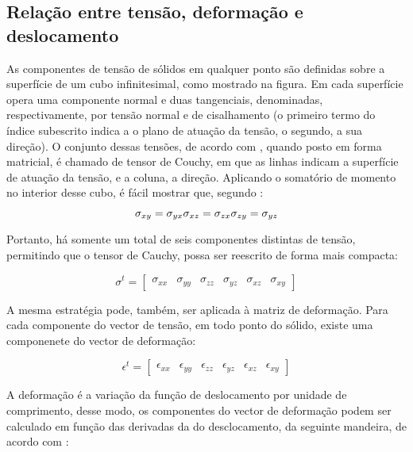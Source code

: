 \subsection{Relação entre tensão, deformação e deslocamento}

As componentes de tensão de sólidos em qualquer ponto são definidas sobre a superfície de um cubo infinitesimal, como mostrado na figura. Em cada superfície opera uma componente normal e duas tangenciais, denominadas, respectivamente, por tensão normal e de cisalhamento (o primeiro termo do índice subescrito indica a o plano de atuação da tensão, o segundo, a sua direção). O conjunto dessas tensões, de acordo com , quando posto em forma matricial, é chamado de tensor de Couchy, em que as linhas indicam a superfície de atuação da tensão, e a coluna, a direção. Aplicando o somatório de momento no interior desse cubo, é fácil mostrar que, segundo :

\begin{equation}
    \sigma_{xy} = \sigma_{yx} \\
    \sigma_{xz} = \sigma_{zx} \\
    \sigma_{zy} = \sigma_{yz} \\
\end{equation}

Portanto, há somente um total de seis componentes distintas de tensão, permitindo que o tensor de Cauchy, possa ser reescrito de forma mais compacta:

\begin{equation} \label{eq:vetor_tensao}
    \sigma^t =  \begin{bmatrix}
        \sigma_{xx} & \sigma_{yy} & \sigma_{zz} & \sigma_{yz} & \sigma_{xz} & \sigma_{xy}
    \end{bmatrix}
\end{equation}

A mesma estratégia pode, também, ser aplicada à matriz de deformação. Para cada componente do vector de tensão, em todo ponto do sólido, existe uma componenete do vector de deformação:

\begin{equation} \label{eq:vector_deformacao}
    \epsilon^t =  \begin{bmatrix}
        \epsilon_{xx} & \epsilon_{yy} & \epsilon_{zz} & \epsilon_{yz} & \epsilon_{xz} & \epsilon_{xy}
     \end{bmatrix}
\end{equation}

A deformação é a variação da função de deslocamento por unidade de comprimento, desse modo, os componentes do vector de deformação podem ser calculado em função das derivadas da do desclocamento, da seguinte mandeira, de acordo com :

